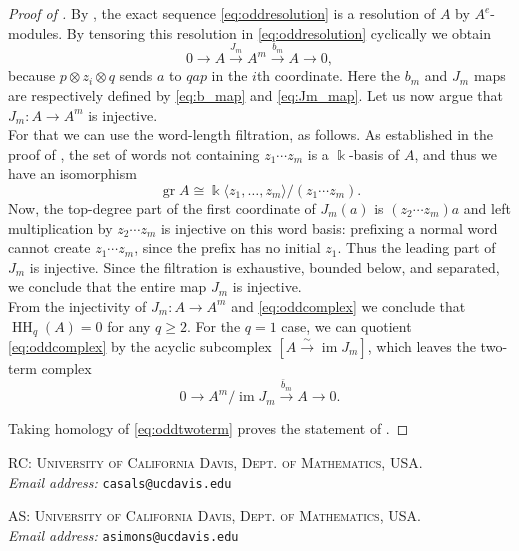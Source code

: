 \documentclass[11pt]{article}
\newcommand{\kk}{\Bbbk}
\newcommand{\HH}{\operatorname{HH}}
\newcommand{\im}{\operatorname{im}}
\newcommand{\gr}{\operatorname{gr}}
\begin{document}
\begin{proof}[Proof of ]
By , the exact sequence \eqref{eq:oddresolution} is a resolution of $A$ by $A^e$-modules. By tensoring this resolution in \eqref{eq:oddresolution} cyclically we obtain
\begin{equation}\label{eq:oddcomplex}
0\longrightarrow A\xrightarrow{J_m}A^m\xrightarrow{b_m}A\longrightarrow0,
\end{equation}
because $p\otimes z_i\otimes q$ sends $a$ to $qap$ in the $i$th coordinate. Here the $b_m$ and $J_m$ maps are respectively defined by \eqref{eq:b_map} and \eqref{eq:Jm_map}. Let us now argue that $J_m:A\to A^m$ is injective.\\

\noindent For that we can use the word-length filtration, as follows. As established in the proof of , the set of words not containing $z_1\cdots z_m$ is a $\kk$-basis of $A$, and thus we have an isomorphism
$$\gr A\cong \kk\langle z_1,\ldots,z_m\rangle/(z_1\cdots z_m).$$
\noindent Now, the top-degree part of the first coordinate of
$J_m(a)$ is $(z_2\cdots z_m)a$ and left multiplication by $z_2\cdots z_m$ is
injective on this word basis: prefixing a normal word cannot create
$z_1\cdots z_m$, since the prefix has no initial $z_1$. Thus the leading part of $J_m$ is injective. Since the filtration is exhaustive, bounded below, and separated, we conclude that the entire map $J_m$ is injective.\\

From the injectivity of $J_m:A\to A^m$ and \eqref{eq:oddcomplex} we conclude that $\HH_q(A)=0$ for any $q\ge2$. For the $q=1$ case, we can quotient \eqref{eq:oddcomplex} by the acyclic subcomplex
$[A\xrightarrow{\sim}\im J_m]$, which leaves the two-term complex
\begin{equation}\label{eq:oddtwoterm}
0\longrightarrow A^m/\im J_m\xrightarrow{\bar b_m}A\longrightarrow0.
\end{equation}

Taking homology of \eqref{eq:oddtwoterm} proves the statement of .
\end{proof}




\textsc{RC: University of California Davis, Dept. of Mathematics, USA.\\}
\textit{Email address:} \texttt{casals@ucdavis.edu}
\vspace{0.2cm}

\textsc{AS: University of California Davis, Dept. of Mathematics, USA.\\}
\textit{Email address:} \texttt{asimons@ucdavis.edu}
\vspace{0.2cm}
\end{document}
